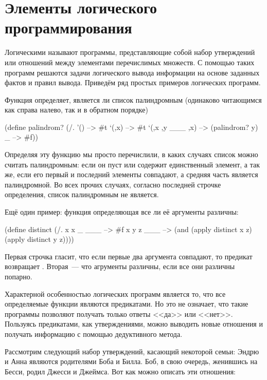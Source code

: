 \section{Элементы логического программирования}%
Логическими называют программы, представляющие собой набор утверждений или отношений между элементами перечислимых множеств. С помощью таких программ решаются задачи логического вывода информации на основе заданных фактов и правил вывода.
Приведём ряд простых примеров логических программ.

Функция  определяет, является ли список палиндромным (одинаково читающимся как справа налево, так и в обратном порядке)

\begin{SchemeCode}[emph={x,y}]
(define palindrom?
  (/. '() --> #t
      `(,x) --> #t
      `(,x ,y ___ ,x) --> (palindrom? y)
      _ --> #f))
\end{SchemeCode}

Определяя эту функцию мы просто перечислили, в каких случаях список можно считать палиндромным: если он пуст или содержит единственный элемент, а так же, если его первый и последний элементы совпадают, а средняя часть является палиндромной. Во всех прочих случаях, согласно последней строчке определения, список палиндромным не является.

Ещё один пример: функция  определяющая все ли её аргументы различны:

\begin{SchemeCode}
(define distinct
  (/. x x _ ___ --> #f
      x y z ___ --> (and (apply distinct x z)
                         (apply distinct y z))))
\end{SchemeCode}

Первая строчка гласит, что если первые два аргумента совпадают, то предикат возвращает . Вторая~--- что агрументы различны, если все они различны попарно.

Характерной особенностью логических программ является то, что все определяемые функции являются предикатами. Но это не означает, что такие программы позволяют получать только ответы <<да>> или <<нет>>. Пользуясь предикатами, как утверждениями, можно выводить новые отношения и получать информацию с помощью дедуктивного метода.

Рассмотрим следующий набор утверждений, касающий некоторой семьи:
Эндрю и Анна являются родителями Боба и Билла. Боб, в свою очередь, женившись на Бесси, родил Джесси и Джеймса. Вот как можно описать эти отношения:


